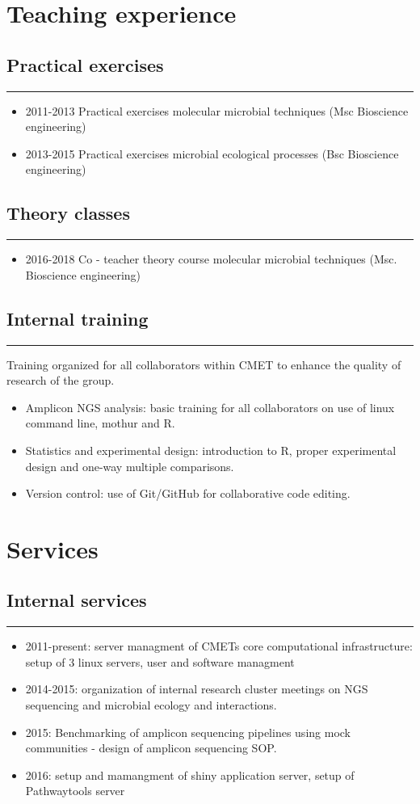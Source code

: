 \documentclass[a4paper,11pt,oneside]{article}
\begin{document}
\section*{Teaching experience}
\subsection*{Practical exercises}
\rule{\textwidth}{1pt}
\begin{itemize}
  \item 2011-2013 Practical exercises molecular microbial techniques (Msc Bioscience engineering)
  \item 2013-2015 Practical exercises microbial ecological processes (Bsc Bioscience engineering)
\end{itemize}
\subsection*{Theory classes}
\rule{\textwidth}{1pt}
\begin{itemize}
  \item 2016-2018 Co - teacher theory course molecular microbial techniques (Msc. Bioscience engineering) 
\end{itemize}
\subsection*{Internal training}
\rule{\textwidth}{1pt}
Training organized for all collaborators within CMET to enhance the quality of research of the group.
\begin{itemize}
  \item Amplicon NGS analysis: basic training for all collaborators on use of linux command line, mothur and R.
  \item Statistics and experimental design: introduction to R, proper experimental design and one-way multiple comparisons.
  \item Version control: use of Git/GitHub for collaborative code editing.
\end{itemize}

\section*{Services}

\subsection*{Internal services}
\rule{\textwidth}{1pt}
\begin{itemize}
	\item 2011-present: server managment of CMETs core computational infrastructure: setup of 3 linux servers, user and software managment
	\item 2014-2015: organization of internal research cluster meetings on NGS sequencing and microbial ecology and interactions.
	\item 2015: Benchmarking of amplicon sequencing pipelines using mock communities - design of amplicon sequencing SOP.
	\item 2016: setup and mamangment of shiny application server, setup of Pathwaytools server
\end{itemize}
\end{document}
